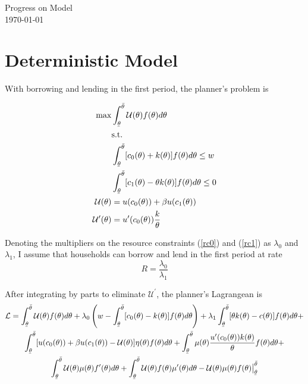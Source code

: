 \documentclass[11pt]{article}
\newcommand{\ubar}[1]{\underaccent{\bar}{#1}}
\newcommand{\p}{\prime}
\newcommand{\lagr}{\mathcal{L}}
\newcommand{\U}{\mathcal{U}}
\begin{document}
\begin{flushleft}
    Progress on Model \\
    \today
\end{flushleft}

\section{Deterministic Model}

With borrowing and lending in the first period, the planner's problem is

\begin{align}
    \max &\int_{\ubar{\theta}}^{\bar{\theta}} \U(\theta)f(\theta)d\theta \label{s1prob} \\ 
    &\text{s.t.} \notag \\
    &\int_{\ubar{\theta}}^{\bar{\theta}}[c_0(\theta) + k(\theta)]f(\theta)d\theta \leq w \label{rc0} \\
    &\int_{\ubar{\theta}}^{\bar{\theta}} [c_1(\theta) - \theta k(\theta)]f(\theta)d\theta \leq 0 \label{rc1} \\
    \U(\theta) &= u(c_0(\theta)) + \beta u(c_1(\theta)) \label{pkc} \\
    \U^\p(\theta) &= u^\p(c_0(\theta))\frac{k}{\theta} \label{icc}
\end{align}

Denoting the multipliers on the resource constraints (\ref{rc0}) and (\ref{rc1}) as \( \lambda_0 \) and \( \lambda_1 \), I assume that households can borrow and lend in the first period at rate 
\[R = \frac{\lambda_0}{\lambda_1}\]

After integrating by parts to eliminate \( \U^\p \), the planner's Lagrangean is 
\begin{multline}
    \lagr = \int_{\ubar{\theta}}^{\bar{\theta}} \U(\theta)f(\theta)d\theta + \lambda_0\left( w - \int_{\ubar{\theta}}^{\bar{\theta}} [c_0(\theta) - k(\theta)]f(\theta)d\theta \right) + \lambda_1 \int_{\ubar{\theta}}^{\bar{\theta}}[\theta k(\theta) - c(\theta)]f(\theta)d\theta + \\ 
    \int_{\ubar{\theta}}^{\bar{\theta}}[u(c_0(\theta)) + \beta u(c_1(\theta)) - \U(\theta)]\eta(\theta)f(\theta)d\theta +  \int_{\ubar{\theta}}^{\bar{\theta}} \mu(\theta)\frac{u^\p(c_0(\theta))k(\theta)}{\theta}f(\theta)d\theta + \\
    \int_{\ubar{\theta}}^{\bar{\theta}}\U(\theta)\mu(\theta)f^\p(\theta)d\theta + \int_{\ubar{\theta}}^{\bar{\theta}}\U(\theta)f(\theta)\mu^\p(\theta)d\theta - \U(\theta)\mu(\theta)f(\theta)\big|_{\ubar{\theta}}^{\bar{\theta}}
\end{multline}
\end{document}
